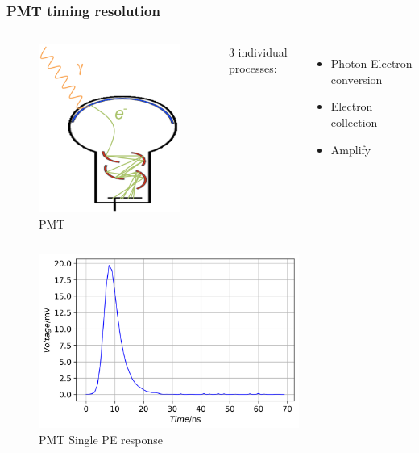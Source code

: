 \documentclass{beamer}
\begin{document}
\begin{frame}
\frametitle{PMT timing resolution}
\setlength{\abovecaptionskip}{-2mm}
\setlength{\belowcaptionskip}{0mm}
\begin{columns}
\begin{figure}
    \centering
    \caption{PMT}
    \includegraphics[width=0.25\linewidth]{img/PMT.png}
\end{figure}
\begin{center}
    3 individual processes:
\end{center}
\vspace{-4mm}
\begin{itemize}
    \item Photon-Electron conversion
    \item Electron collection
    \item Amplify
\end{itemize}
\end{columns}
\begin{columns}
\begin{figure}
    \centering
    \caption{PMT Single PE response}
    \includegraphics[width=1.0\linewidth]{img/pmtspe.png}
\end{figure}
\begin{figure}

\end{figure}
\end{columns}
\end{frame}
\end{document}
